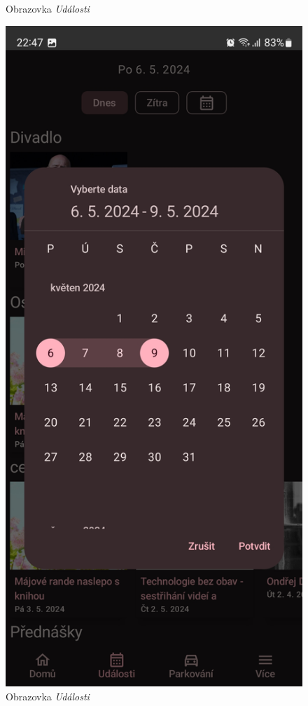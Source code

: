 \begin{figure}[H]
    \caption{Obrazovka \textit{Události}}
  \endminipage\hfill
    \includegraphics[width=\linewidth]{screens/2b_B.jpg}
    \caption{Obrazovka \textit{Události}}
  \endminipage\hfill
\end{figure}

